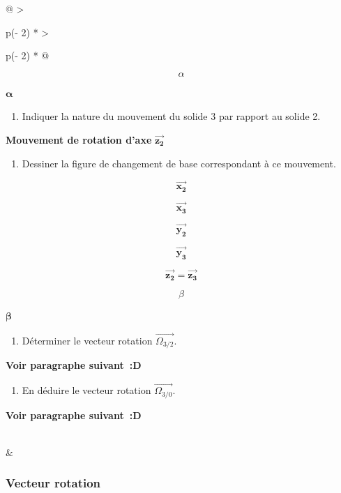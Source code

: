 \begin{longtable}{@{}
  >{\raggedright\arraybackslash}p{(\columnwidth - 2\tabcolsep) * }
  >{\raggedright\arraybackslash}p{(\columnwidth - 2\tabcolsep) * }@{}}
\begin{minipage}[b]{\linewidth}
\[\alpha\]

\(\mathbf{\alpha}\)

\begin{enumerate}
\def\labelenumi{\arabic{enumi}.}
\setcounter{enumi}{6}
\item
  Indiquer la nature du mouvement du solide 3 par rapport au solide 2.
\end{enumerate}

\textbf{Mouvement de rotation d'axe}
\(\overrightarrow{\mathbf{z}_{\mathbf{2}}}\)

\begin{enumerate}
\def\labelenumi{\arabic{enumi}.}
\setcounter{enumi}{7}
\item
  Dessiner la figure de changement de base correspondant à ce mouvement.
\end{enumerate}

\[\overrightarrow{\mathbf{x}_{\mathbf{2}}}\]

\[\overrightarrow{\mathbf{x}_{\mathbf{3}}}\]

\[\overrightarrow{\mathbf{y}_{\mathbf{2}}}\]

\[\overrightarrow{\mathbf{y}_{\mathbf{3}}}\]

\[\overrightarrow{\mathbf{z}_{\mathbf{2}}}\mathbf{=}\overrightarrow{\mathbf{z}_{\mathbf{3}}}\]

\[\beta\]

\(\mathbf{\beta}\)

\begin{enumerate}
\def\labelenumi{\arabic{enumi}.}
\setcounter{enumi}{8}
\item
  Déterminer le vecteur rotation \(\overrightarrow{\Omega_{3/2}}\).
\end{enumerate}

\textbf{Voir paragraphe suivant~:D}

\begin{enumerate}
\def\labelenumi{\arabic{enumi}.}
\setcounter{enumi}{9}
\item
  En déduire le vecteur rotation \(\overrightarrow{\Omega_{3/0}}\).
\end{enumerate}

\textbf{Voir paragraphe suivant~:D}
\end{minipage} \\
\midrule\noalign{}
\endhead
\bottomrule\noalign{}
\endlastfoot
& \\
\end{longtable}

\subsubsection{Vecteur rotation}\label{vecteur-rotation}

